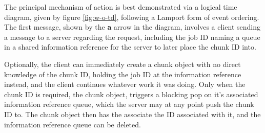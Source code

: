 The principal mechanism of action is best demonstrated via a logical time
diagram, given by figure \ref{fig:w-o-td}, following a Lamport form of
event ordering\cite{lamport1978ordering}.
The first message, shown by the \textbf{a} arrow in the diagram, involves a
client sending a message to a server regarding the request, including the job
ID naming a queue in a shared information reference for the server to later
place the chunk ID into.

Optionally, the client can immediately create a chunk object with no direct
knowledge of the chunk ID, holding the job ID at the information reference
instead, and the client continues whatever work it was doing.
Only when the chunk ID is required, the chunk object, triggers a blocking pop
on it's associated information reference queue, which the server may
at any point push the chunk ID to.
The chunk object then has the associate the ID associated with it, and the
information reference queue can be deleted.

